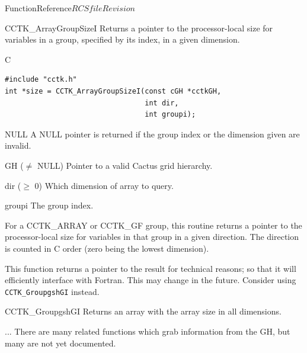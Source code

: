 \begin{cactuspart}{FunctionReference}{$RCSfile$}{$Revision$}
\begin{FunctionDescription}{CCTK\_ArrayGroupSizeI}{}
\label{CCTK-ArrayGroupSizeI}
Returns a pointer to the processor-local size for variables in a
group, specified by its index, in a given dimension.
\begin{SynopsisSection}
\begin{Synopsis}{C}
\begin{verbatim}
#include "cctk.h"
int *size = CCTK_ArrayGroupSizeI(const cGH *cctkGH,
                                 int dir,
                                 int groupi);
\end{verbatim}
\end{Synopsis}
\end{SynopsisSection}

\begin{ResultSection}
\begin{Result}{NULL}
A NULL pointer is returned if the group index or the dimension given are invalid.
\end{Result}
\end{ResultSection}

\begin{ParameterSection}
\begin{Parameter}{GH ($\ne$ NULL)}
Pointer to a valid Cactus grid hierarchy.
\end{Parameter}
\begin{Parameter}{dir ($\ge$ 0)}
Which dimension of array to query.
\end{Parameter}
\begin{Parameter}{groupi}
The group index.
\end{Parameter}
\end{ParameterSection}

\begin{Discussion}
For a CCTK\_ARRAY or CCTK\_GF group, this routine returns a pointer to
the processor-local size for variables in that group in a given
direction. The direction is counted in C order (zero being the lowest
dimension).

This function returns a pointer to the result for technical reasons;
so that it will efficiently interface with Fortran.  This may change
in the future.  Consider using \texttt{CCTK\_GroupgshGI} instead.
\end{Discussion}

\begin{SeeAlsoSection}
\begin{SeeAlso}{CCTK\_GroupgshGI}
Returns an array with the array size in all dimensions.
\end{SeeAlso}
\begin{SeeAlso}{...}
There are many related functions which grab information from the GH,
but many are not yet documented.
\end{SeeAlso}
\end{SeeAlsoSection}
\end{FunctionDescription}



\end{cactuspart}
